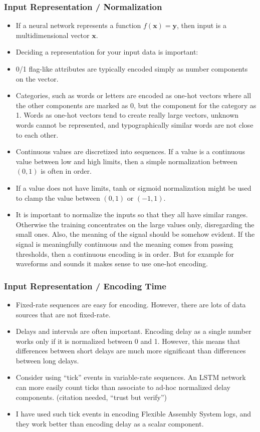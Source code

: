 \documentclass[8pt]{beamer}
\begin{document}
\begin{frame}
\frametitle{Input Representation / Normalization}
 \begin{itemize}
  \item If a neural network represents a function $ f(\mathbf{x}) = \mathbf{y} $, then input is a multidimensional vector $ \mathbf{x} $.
  \item Deciding a representation for your input data is important:
  \item 0/1 flag-like attributes are typically encoded simply as number components on the vector.
  \item Categories, such as words or letters are encoded as one-hot
        vectors where all the other components are marked as 0, but the component for the category as 1. Words as one-hot vectors tend to create really large vectors,
        unknown words cannot be represented, and typographically similar words are not close to each other.
  \item Continuous values are discretized into sequences. If a value is a continuous value between low and high limits, then a simple normalization between $ (0, 1) $
        is often in order.
  \item If a value does not have limits, tanh or sigmoid normalization might be used to clamp the value between $ (0, 1) $ or $(-1, 1) $.
  \item It is important to normalize the inputs so that they all have similar ranges. Otherwise the training concentrates on the large values only, disregarding the small ones.
        Also, the meaning of the signal should be somehow evident. If the signal is meaningfully continuous and the meaning comes from passing thresholds, then a continuous
        encoding is in order. But for example for waveforms and sounds it makes sense to use one-hot encoding.
 \end{itemize}
\end{frame}

\begin{frame}
\frametitle{Input Representation / Encoding Time}
 \begin{itemize}
  \item Fixed-rate sequences are easy for encoding. However, there are lots of data sources that are not fixed-rate.
  \item Delays and intervals are often important. Encoding delay as a single number works only if it is normalized between 0 and 1. However, this means that
        differences between short delays are much more significant than differences between long delays.
  \item Consider using ``tick'' events in variable-rate sequences. An LSTM network can more easily count ticks than associate to ad-hoc normalized delay components.
        (citation needed, ``trust but verify'')
  \item I have used such tick events in encoding Flexible Assembly System logs, and they work better than encoding delay as a scalar component.
 \end{itemize}
\end{frame}
\end{document}
